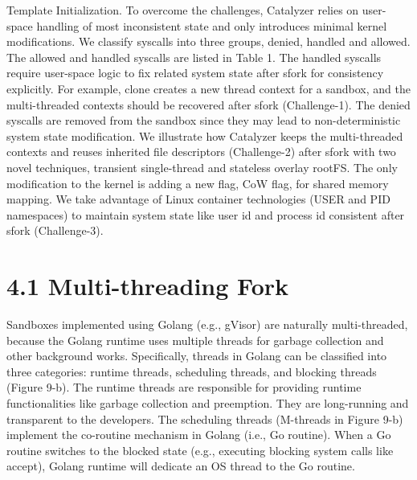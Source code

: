 \documentclass[
  10
]{article}
\begin{document}
Template Initialization. To overcome the challenges, Catalyzer relies on
user-space handling of most inconsistent state and only introduces
minimal kernel modifications. We classify syscalls into three groups,
denied, handled and allowed. The allowed and handled syscalls are listed
in Table 1. The handled syscalls require user-space logic to fix related
system state after sfork for consistency explicitly. For example, clone
creates a new thread context for a sandbox, and the multi-threaded
contexts should be recovered after sfork (Challenge-1). The denied
syscalls are removed from the sandbox since they may lead to
non-deterministic system state modification. We illustrate how Catalyzer
keeps the multi-threaded contexts and reuses inherited file descriptors
(Challenge-2) after sfork with two novel techniques, transient
single-thread and stateless overlay rootFS. The only modification to the
kernel is adding a new flag, CoW flag, for shared memory mapping. We
take advantage of Linux container technologies (USER and PID namespaces)
to maintain system state like user id and process id consistent after
sfork (Challenge-3).

\section{4.1 Multi-threading Fork}\label{multi-threading-fork}

Sandboxes implemented using Golang (e.g., gVisor) are naturally
multi-threaded, because the Golang runtime uses multiple threads for
garbage collection and other background works. Specifically, threads in
Golang can be classified into three categories: runtime threads,
scheduling threads, and blocking threads (Figure 9-b). The runtime
threads are responsible for providing runtime functionalities like
garbage collection and preemption. They are long-running and transparent
to the developers. The scheduling threads (M-threads in Figure 9-b)
implement the co-routine mechanism in Golang (i.e., Go routine). When a
Go routine switches to the blocked state (e.g., executing blocking
system calls like accept), Golang runtime will dedicate an OS thread to
the Go routine.
\end{document}
